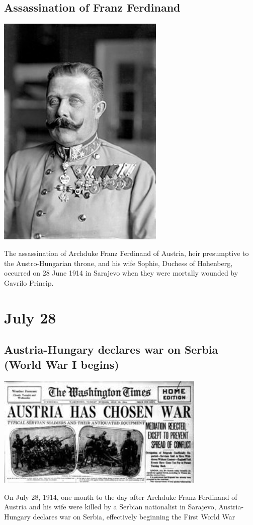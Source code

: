 \documentclass[11pt]{report}
\begin{document}
\subsection{Assassination of Franz Ferdinand}
\vspace{2mm}\begin{center}\includegraphics[width=8cm]{./img/ferdinand.jpg}\end{center}
The assassination of Archduke Franz Ferdinand of Austria, heir presumptive to the Austro-Hungarian throne, and his wife Sophie, Duchess of Hohenberg, occurred on 28 June 1914 in Sarajevo when they were mortally wounded by Gavrilo Princip.

\section{July 28}
\subsection{Austria-Hungary declares war on Serbia (World War I begins)}
\vspace{2mm}\begin{center}\includegraphics[width=10cm]{./img/austriaWarSerbia.jpg}\end{center}
On July 28, 1914, one month to the day after Archduke Franz Ferdinand of Austria and his wife were killed by a Serbian nationalist in Sarajevo, Austria-Hungary declares war on Serbia, effectively beginning the First World War
\end{document}
